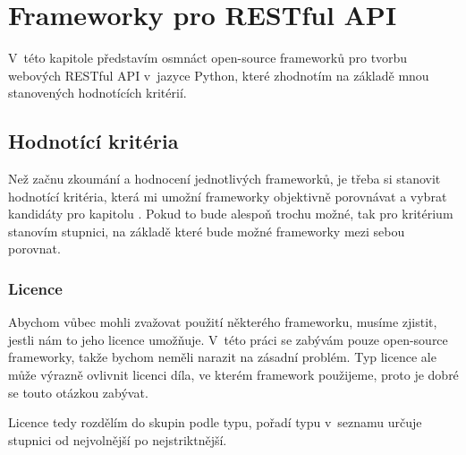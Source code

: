 \chapter{Frameworky pro RESTful API \label{frameworky}}

V~této kapitole představím osmnáct open-source frameworků pro tvorbu webových RESTful API v~jazyce Python, které zhodnotím na základě mnou stanovených hodnotících kritérií.

\section{\texorpdfstring{Hodnotící kritéria \label{kriteria}}{Hodnotící kritéria }}\label{hodnotuxedcuxed-krituxe9ria}

Než začnu zkoumání a hodnocení jednotlivých frameworků, je třeba si stanovit hodnotící kritéria, která mi umožní frameworky objektivně porovnávat a vybrat kandidáty pro kapitolu \emph{}. Pokud to bude alespoň trochu možné, tak pro kritérium stanovím stupnici, na základě které bude možné frameworky mezi sebou porovnat.

\subsection{Licence}\label{licence}

Abychom vůbec mohli zvažovat použití některého frameworku, musíme zjistit, jestli nám to jeho licence umožňuje. V~této práci se zabývám pouze open-source frameworky, takže bychom neměli narazit na zásadní problém. Typ licence ale může výrazně ovlivnit licenci díla, ve kterém framework použijeme, proto je dobré se touto otázkou zabývat.

Licence tedy rozdělím do skupin podle typu, pořadí typu v~seznamu určuje stupnici od nejvolnější po nejstriktnější.

